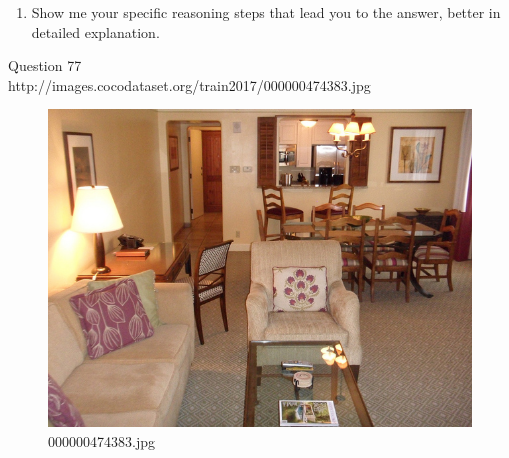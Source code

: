 \begin{enumerate}
    Here are some additional details about the spatial relationship between the person with the black hat and the person with blonde hair:
    
    The person with the black hat is wearing a black hat and a black jacket.
    The person with blonde hair is wearing a white shirt and blue jeans.
    The person with the black hat is standing behind the person with blonde hair, meaning that the person with the black hat is not blocking the view of the person with blonde hair.
    The person with blonde hair is not blocking the view of the person with the black hat.
    Is there anything else I can help you with?
    \item Show me your specific reasoning steps that lead you to the answer, better in detailed explanation.
\end{enumerate}
Question 77\\
http://images.cocodataset.org/train2017/000000474383.jpg
\begin{figure}[h]
    \centering
    \includegraphics[width=0.8\linewidth]{../image set/hard/000000474383.jpg}
    \caption{000000474383.jpg}
\end{figure}
